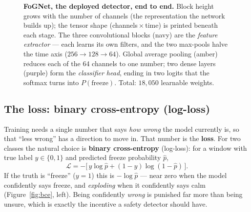 \documentclass[11pt]{article}
\begin{document}
\begin{figure}[h]
{}
  \caption{\textbf{FoGNet, the deployed detector, end to end.} Block height grows
  with the number of channels (the representation the network builds up); the
  tensor shape (channels\,$\times$\,time) is printed beneath each stage. The three
  convolutional blocks (navy) are the \emph{feature extractor} --- each learns its
  own filters, and the two max-pools halve the time axis ($256\!\to\!128\!\to\!64$).
  Global average pooling (amber) reduces each of the 64 channels to one number; two
  dense layers (purple) form the \emph{classifier head}, ending in two logits that
  the softmax turns into $P(\mathrm{freeze})$. Total: $18{,}050$ learnable weights.}
  \label{fig:cnnarch}
\end{figure}

\subsection{The loss: binary cross-entropy (log-loss)}
Training needs a single number that says \emph{how wrong} the model currently is,
so that ``less wrong'' has a direction to move in. That number is the
\textbf{loss}. For two classes the natural choice is \textbf{binary
cross-entropy} (log-loss): for a window with true label $y\in\{0,1\}$ and
predicted freeze probability $\hat p$,
\[
  \mathcal{L} = -\big[\,y\log\hat p + (1-y)\log(1-\hat p)\,\big].
\]
If the truth is ``freeze'' ($y=1$) this is $-\log\hat p$ --- near zero when the
model confidently says freeze, and \emph{exploding} when it confidently says calm
(Figure~\ref{fig:bce}, left). Being confidently \emph{wrong} is punished far more
than being unsure, which is exactly the incentive a safety detector should have.
\end{document}
